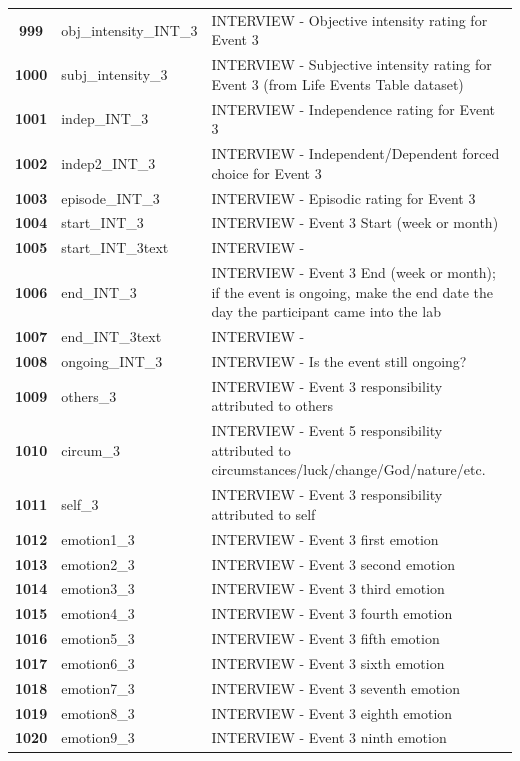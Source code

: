 \documentclass[
  letterpaper,
  DIV=11,
  numbers=noendperiod]{scrartcl}
\begin{document}
\begin{longtable}[t]{>{}cll}
\textbf{999} & obj\_intensity\_INT\_3 & INTERVIEW - Objective intensity rating for Event 3\\
\textbf{1000} & subj\_intensity\_3 & INTERVIEW - Subjective intensity rating for Event 3 (from Life Events Table dataset)\\
\addlinespace
\textbf{1001} & indep\_INT\_3 & INTERVIEW - Independence rating for Event 3\\
\textbf{1002} & indep2\_INT\_3 & INTERVIEW - Independent/Dependent forced choice for Event 3\\
\textbf{1003} & episode\_INT\_3 & INTERVIEW - Episodic rating for Event 3\\
\textbf{1004} & start\_INT\_3 & INTERVIEW - Event 3 Start (week or month)\\
\textbf{1005} & start\_INT\_3text & INTERVIEW -\\
\addlinespace
\textbf{1006} & end\_INT\_3 & INTERVIEW - Event 3 End (week or month); if the event is ongoing, make the end date the day the participant came into the lab\\
\textbf{1007} & end\_INT\_3text & INTERVIEW -\\
\textbf{1008} & ongoing\_INT\_3 & INTERVIEW - Is the event still ongoing?\\
\textbf{1009} & others\_3 & INTERVIEW - Event 3 responsibility attributed to others\\
\textbf{1010} & circum\_3 & INTERVIEW - Event 5 responsibility attributed to circumstances/luck/change/God/nature/etc.\\
\addlinespace
\textbf{1011} & self\_3 & INTERVIEW - Event 3 responsibility attributed to self\\
\textbf{1012} & emotion1\_3 & INTERVIEW - Event 3 first emotion\\
\textbf{1013} & emotion2\_3 & INTERVIEW - Event 3 second emotion\\
\textbf{1014} & emotion3\_3 & INTERVIEW - Event 3 third emotion\\
\textbf{1015} & emotion4\_3 & INTERVIEW - Event 3 fourth emotion\\
\addlinespace
\textbf{1016} & emotion5\_3 & INTERVIEW - Event 3 fifth emotion\\
\textbf{1017} & emotion6\_3 & INTERVIEW - Event 3 sixth emotion\\
\textbf{1018} & emotion7\_3 & INTERVIEW - Event 3 seventh emotion\\
\textbf{1019} & emotion8\_3 & INTERVIEW - Event 3 eighth emotion\\
\textbf{1020} & emotion9\_3 & INTERVIEW - Event 3 ninth emotion\\

\end{longtable}
\end{document}
